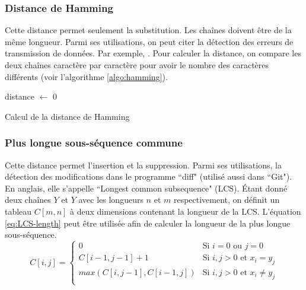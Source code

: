 \documentclass{KodeBook}
\begin{document}
\subsubsection{Distance de Hamming}

Cette distance permet seulement la substitution.
Les chaînes doivent être de la même longueur.
Parmi ses utilisations, on peut citer la détection des erreurs de transmission de données.\newline
Par exemple, .
Pour calculer la distance, on compare les deux chaînes caractère par caractère pour avoir le nombre des caractères différents (voir l'algorithme \ref{algo:hamming}).

\begin{algorithm}[H]
	distance $\leftarrow$ 0\;
	

	\caption{Calcul de la distance de Hamming \label{algo:hamming}}
	
\end{algorithm}


\subsubsection{Plus longue sous-séquence commune}

Cette distance permet l'insertion et la suppression.
Parmi ses utilisations, la détection des modifications dans le programme ``diff" (utilisé aussi dans ``Git").
En anglais, elle s'appelle ``Longest common subsequence" (LCS).
Étant donné deux chaînes $Y$ et $Y$ avec les longueurs $n$ et $m$ respectivement, on définit un tableau $C[m, n]$ à deux dimensions contenant la longueur de la LCS.
L'équation \ref{eq:LCS-length} peut être utilisée afin de calculer la longueur de la plus longue sous-séquence. 
\begin{equation}
	C[i, j] =  
	\begin{cases}
		0 & \text{Si } i = 0 \text{ ou } j=0\\
		C[i-1, j-1] + 1 & \text{Si } i,j > 0 \text{ et } x_i = y_j\\
		max (C[i, j-1], C[i-1, j]) & \text{Si } i,j > 0 \text{ et } x_i \ne y_j\\
	\end{cases}
	\label{eq:LCS-length}
\end{equation}
\end{document}
